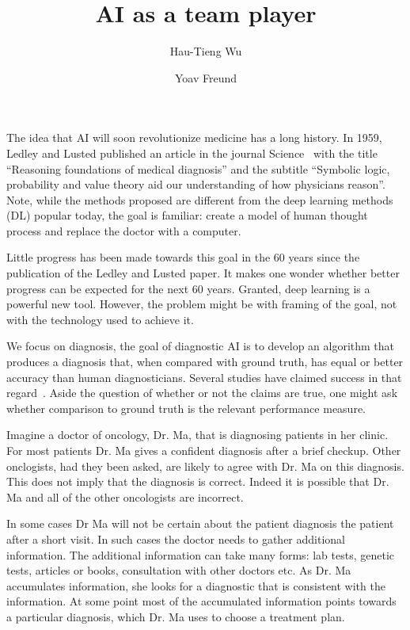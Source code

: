 \documentclass[11pt]{pnas-new}
\author[1]{Hau-Tieng Wu}
\author[2]{Yoav Freund}
\affil[1]{Duke, Mathematics and Statistical Science, Durham, 27708, USA}
\affil[2]{UCSD, Computer Science, San Diego, 92093, United States. yfreund@eng.ucsd.edu}
\title{AI as a team player}
\begin{document}
\maketitle

The idea that AI will soon revolutionize medicine has a long history.
In 1959, Ledley and Lusted published an article in the journal
Science~\cite{ledley1959reasoning} with the title ``Reasoning
foundations of medical diagnosis'' and the subtitle ``Symbolic logic,
probability and value theory aid our understanding of how physicians
reason''. Note, while the methods proposed are different from the deep
learning methods (DL) popular today, the goal is familiar: create a
model of human thought process and replace the doctor with a computer.

Little progress has been made towards this goal in the 60 years since
the publication of the Ledley and Lusted paper. It makes one wonder
whether better progress can be expected for the next 60
years. Granted, deep learning is a powerful new tool. However, the
problem might be with framing of the goal, not with the technology
used to achieve it.

We focus on diagnosis, the goal of diagnostic AI is to develop an
algorithm that produces a diagnosis that, when compared with ground
truth, has equal or better accuracy than human diagnosticians. Several
studies have claimed success in that regard~\cite{}. Aside the
question of whether or not the claims are true, one might ask whether
comparison to ground truth is the relevant performance measure.

Imagine a doctor of oncology, Dr. Ma, that is diagnosing patients in
her clinic.  For most patients Dr. Ma gives a confident diagnosis
after a brief checkup. Other onclogists, had they been asked, are
likely to agree with Dr. Ma on this diagnosis. This does not imply
that the diagnosis is correct. Indeed it is possible that Dr. Ma and
all of the other oncologists are incorrect.

In some cases Dr Ma will not be certain about the patient diagnosis
the patient after a short visit. In such cases the doctor needs to gather
additional information. The additional information can take many
forms: lab tests, genetic tests, articles or books, consultation with
other doctors etc.  As Dr. Ma accumulates information, she looks for a
diagnostic that is consistent with the information. At some point
most of the accumulated information points towards a particular
diagnosis, which Dr. Ma uses to choose a treatment plan.
\end{document}
